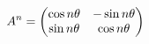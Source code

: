 \documentclass[preview]{standalone}
\begin{document}
\begin{align*}
\special{dvisvgm:raw <g id='unique000'>}A^n=\begin{pmatrix}\cos n\theta&-\sin n\theta\\\sin n\theta&\cos n\theta\end{pmatrix}\special{dvisvgm:raw </g>}
\end{align*}
\end{document}
